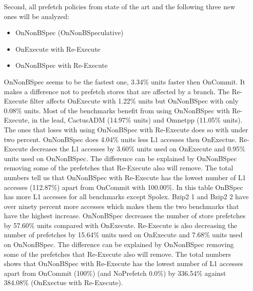 Second, all prefetch policies from state of the art and the following three new ones
will be analyzed:
\begin{itemize}
    \item OnNonBSpec (OnNonBSpeculative)
    \item OnExecute with Re-Execute
    \item OnNonBSpec with Re-Execute
\end{itemize}
\resExtime
{}
OnNonBSpec seems to be the fastest one, 3.34\% units faster then OnCommit.
It makes a difference not to prefetch stores that are affected by a branch. The Re-Execute filter affects OnExecute with 1.22\% units but OnNonBSpec with only 0.08\%
units.
Most of the benchmarks benefit from using OnNonBSpec with Re-Execute, in the
lead, CactusADM (14.97\% units) and Omnetpp (11.05\% units). The ones
that loses with using OnNonBSpec with Re-Execute does so with under two percent.
\resAcc
{}
 OnNonBSpec does 4.04\% units less L1 accesses then OnExectue. Re-Execute decreases the L1 accesses by 3.60\% units used on OnExecute and 0.95\% units used on
 OnNonBSpec. The difference can be explained by OnNonBSpec removing some of the
prefetches that Re-Execute also will remove. The total numbers tell us that OnNonBSpec with Re-Execute has the lowest number of L1 accesses (112.87\%) apart from OnCommit
 with 100.00\%. 
In this table OnBSpec has more L1 accesses for all benchmarks except Spolex.
Bzip2 1 and Bzip2 2 have over ninety percent more accesses which makes them the two benchmarks that have the highest increase.
\resSp
{}
OnNonBSpec decreases the number of store prefetches by 57.60\% units compared
with OnExecute. Re-Execute is also decreasing the number of prefetches by 15.64\%
units used on OnExecute and 7.68\% units used on OnNonBSpec. The difference can
be explained by OnNonBSpec removing some of the prefetches that Re-Execute also
will remove. The total numbers shows that OnNonBSpec with Re-Execute has the
lowest number of L1 accesses apart from OnCommit (100\%) (and NoPrefetch 0.0\%) by 336.54\%
against 384.08\% (OnExectue with Re-Execute).

